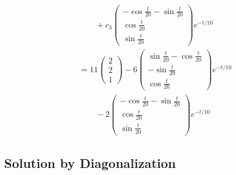 \documentclass{article}
\begin{document}
\begin{enumerate}
\begin{align*}
                     & \qquad + c_3 \begin{pmatrix}
                                      -\cos \frac{t}{20} - \sin \frac{t}{20} \\
                                      \cos \frac{t}{20}                      \\
                                      \sin \frac{t}{20}
                                    \end{pmatrix} e^{-t / 10}                                                                                                                 \\
                     & = 11 \begin{pmatrix}
                              2 \\
                              2 \\
                              1
                            \end{pmatrix} - 6 \begin{pmatrix}
                                                \sin \frac{t}{20} - \cos \frac{t}{20} \\
                                                -\sin \frac{t}{20}                    \\
                                                \cos \frac{t}{20}
                                              \end{pmatrix} e^{-t / 10}                                                                                                        \\
                     & \qquad - 2 \begin{pmatrix}
                                    -\cos \frac{t}{20} - \sin \frac{t}{20} \\
                                    \cos \frac{t}{20}                      \\
                                    \sin \frac{t}{20}
                                  \end{pmatrix} e^{-t / 10}
        \end{align*}
\end{enumerate}

\subsection{Solution by Diagonalization}

\subsubsection{}
\end{document}
